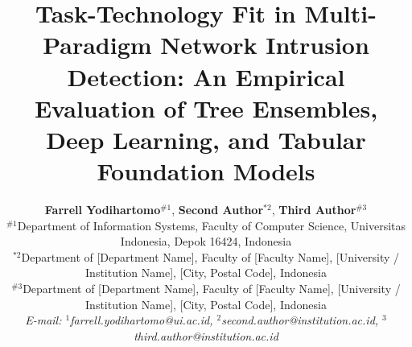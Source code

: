 \documentclass[10pt,a4paper]{article}
\begin{document}
\title{\LARGE\textbf{Task-Technology Fit in Multi-Paradigm Network Intrusion Detection: An Empirical Evaluation of Tree Ensembles, Deep Learning, and Tabular Foundation Models}}

\author{
    \textbf{Farrell Yodihartomo}$^{\#1}$, 
    \textbf{Second Author}$^{*2}$, 
    \textbf{Third Author}$^{\#3}$\\[0.5em]
    \small $^{\#1}$Department of Information Systems, Faculty of Computer Science, Universitas Indonesia, Depok 16424, Indonesia\\
    \small $^{*2}$Department of [Department Name], Faculty of [Faculty Name], [University / Institution Name], [City, Postal Code], Indonesia\\
    \small $^{\#3}$Department of [Department Name], Faculty of [Faculty Name], [University / Institution Name], [City, Postal Code], Indonesia\\[0.3em]
    \small\textit{E-mail: $^{1}$farrell.yodihartomo@ui.ac.id, $^{2}$second.author@institution.ac.id, $^{3}$third.author@institution.ac.id}
}
\date{}

\maketitle
\end{document}
